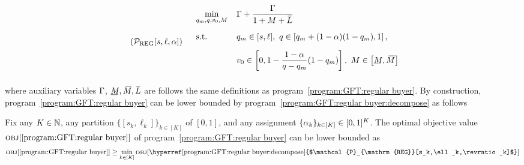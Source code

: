 \begin{align}
\label{program:GFT:regular buyer:decompose}
\tag{$\mathcal{P}_{\mathrm{REG}}[s,\ell,\revratio]$}
\arraycolsep=5.4pt\def\arraystretch{1}
    \begin{array}{llll}
     &\min\limits_{\optquant, \quant, \val_0, M}   & 
      \displaystyle\exanteutilratio + \frac{\exanteutilratio}{1 + M + \LOverBar} &
      \vspace{10pt}
      \\
      \vspace{10pt}
      &\text{s.t.}
      & \optquant\in[s, \ell],~  
      \quant\in \left[\optquant + (1 - \revratio)(1 - \optquant), 1\right],~ 
      & 
      \\
      \vspace{10pt}
      && 
      \val_0\in \left[0, 1 - \displaystyle\frac{1 - \revratio}{\quant - \optquant}(1 - \optquant)\right],~ 
      M\in\left[\MUnderBar, \MOverBar\right]& 
    \end{array}
\end{align}
where auxiliary variables $\Gamma$, $\MUnderBar, \MOverBar, \LOverBar$ are follows the same definitions as program~\ref{program:GFT:regular buyer}. 
By construction, program~\ref{program:GFT:regular buyer} can be lower bounded by program~\ref{program:GFT:regular buyer:decompose} as follows
\begin{lemma}
    Fix any $K\in\mathbb{N}$, any partition $\{[s_k, \ell_k]\}_{k\in[K]}$ of $[0, 1]$, and any assignment $\{\alpha_k\}_{k\in[K]} \in[0, 1]^K$. The optimal objective value $\Obj{\text{\ref{program:GFT:regular buyer}}}$ of program~\ref{program:GFT:regular buyer} can be lower bounded as
    \begin{align*}
        \Obj{\text{\ref{program:GFT:regular buyer}}} 
        \geq 
        \min_{k\in[K]} 
        \Obj{\text{\hyperref[program:GFT:regular buyer:decompose]{$\mathcal{P}_{\mathrm{REG}}[s_k,\ell_k,\revratio_k]$}}}
    \end{align*}
\end{lemma}
